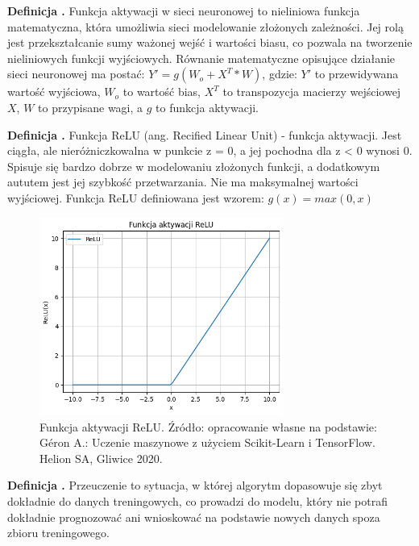 \noindent
\textbf{Definicja .}
\incrementdefinitionIndex
Funkcja aktywacji w sieci neuronowej to nieliniowa funkcja matematyczna,
która umożliwia sieci modelowanie złożonych zależności.
Jej rolą jest przekształcanie sumy ważonej wejść i wartości biasu,
co pozwala na tworzenie nieliniowych funkcji wyjściowych.
Równanie matematyczne opisujące działanie sieci neuronowej ma postać: $Y' = g(W_o + X^T * W)$, gdzie:
$Y'$ to przewidywana wartość wyjściowa,
$W_o$ to wartość bias,
$X^T$ to transpozycja macierzy wejściowej $X$,
$W$ to przypisane wagi,
a $g$ to funkcja aktywacji.

\noindent
\textbf{Definicja .}
\incrementdefinitionIndex
Funkcja ReLU (ang. Recified Linear Unit) - funkcja aktywacji.
Jest ciągła, ale nieróżniczkowalna w punkcie z = 0, a jej pochodna dla z < 0 wynosi 0.
Spisuje się bardzo dobrze w modelowaniu złożonych funkcji, a dodatkowym aututem jest jej szybkość przetwarzania.
Nie ma maksymalnej wartości wyjściowej.
Funkcja ReLU definiowana jest wzorem:
$g(x) = max(0, x)$

\begin{figure}[ht]
	\centering
	\includegraphics[width=8cm]{resources/machine-learning/images/def_relu.png}
	\caption{Funkcja aktywacji ReLU.
		Źródło: opracowanie własne na podstawie:
        Géron A.: Uczenie maszynowe z użyciem Scikit-Learn i TensorFlow. Helion SA, Gliwice 2020.}
    \label{Fig:def-1}
\end{figure}
\FloatBarrier

\noindent
\textbf{Definicja .}
\incrementdefinitionIndex
Przeuczenie to sytuacja, w której algorytm dopasowuje się zbyt dokładnie do danych treningowych,
co prowadzi do modelu, który nie potrafi dokładnie prognozować ani wnioskować na podstawie nowych danych spoza zbioru treningowego.

